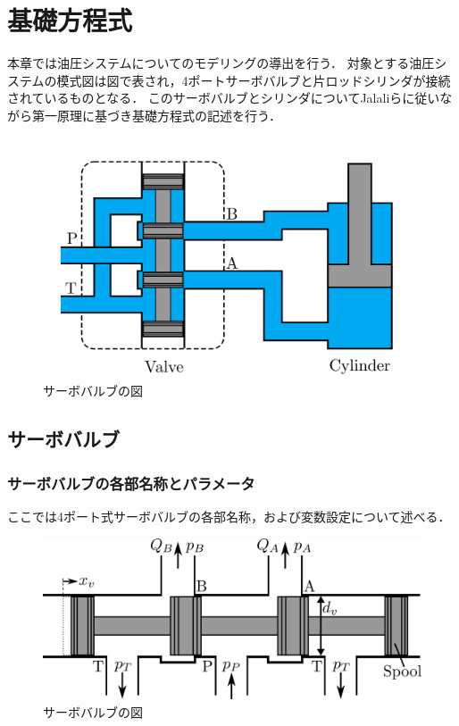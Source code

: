 \chapter{基礎方程式}
本章では油圧システムについてのモデリングの導出を行う．
対象とする油圧システムの模式図は図で表され，4ポートサーボバルブと片ロッドシリンダが接続されているものとなる．
このサーボバルブとシリンダについてJalaliらに従いながら第一原理に基づき基礎方程式の記述を行う．
\begin{figure}[t]
    \centering
        \includegraphics[keepaspectratio, scale=1.0]{contents/基礎方程式/figure/valve-cylinder.png}
        \caption{サーボバルブの図}
        \label{fig:figlabel}
\end{figure}

\section{サーボバルブ}
\subsection{サーボバルブの各部名称とパラメータ}
ここでは4ポート式サーボバルブの各部名称，および変数設定について述べる．
\begin{figure}[t]
    \centering
        \includegraphics[keepaspectratio, scale=1.0]{contents/基礎方程式/figure/valve.png}
        \caption{サーボバルブの図}
        \label{fig:figlabel}
\end{figure}
